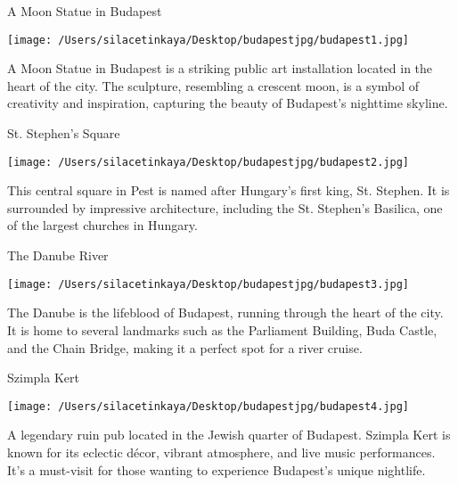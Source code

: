\documentclass[aspectratio=169]{beamer}
\begin{document}
\begin{frame}{A Moon Statue in Budapest}
    \begin{center}
        \texttt{[image: /Users/silacetinkaya/Desktop/budapestjpg/budapest1.jpg]}
    \end{center}
    \vspace{1 em}
    \small
    \textbf{} A Moon Statue in Budapest is a striking public art installation located in the heart of the city. The sculpture, resembling a crescent moon, is a symbol of creativity and inspiration, capturing the beauty of Budapest's nighttime skyline.
\end{frame}

\begin{frame}{St. Stephen's Square}
    \begin{center}
        \texttt{[image: /Users/silacetinkaya/Desktop/budapestjpg/budapest2.jpg]}
    \end{center}
    \vspace{1em}
    \small
    \textbf{} This central square in Pest is named after Hungary's first king, St. Stephen. It is surrounded by impressive architecture, including the St. Stephen’s Basilica, one of the largest churches in Hungary.
\end{frame}

\begin{frame}{The Danube River}
    \begin{center}
        \texttt{[image: /Users/silacetinkaya/Desktop/budapestjpg/budapest3.jpg]}
    \end{center}
    \vspace{1em}
    \small
    \textbf{} The Danube is the lifeblood of Budapest, running through the heart of the city. It is home to several landmarks such as the Parliament Building, Buda Castle, and the Chain Bridge, making it a perfect spot for a river cruise.
\end{frame}

\begin{frame}{Szimpla Kert}
    \begin{center}
        \texttt{[image: /Users/silacetinkaya/Desktop/budapestjpg/budapest4.jpg]}
    \end{center}
    \vspace{1em}
    \small
    \textbf{} A legendary ruin pub located in the Jewish quarter of Budapest. Szimpla Kert is known for its eclectic décor, vibrant atmosphere, and live music performances. It's a must-visit for those wanting to experience Budapest's unique nightlife.
\end{frame}
\end{document}
